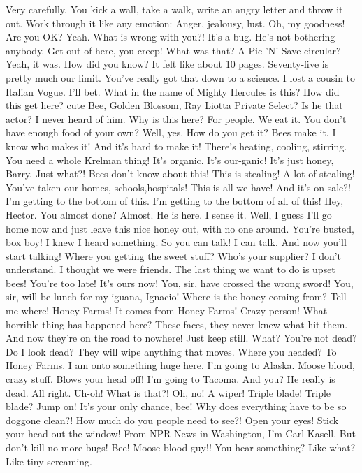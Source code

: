 \documentclass[a4paper,12pt]{article}
\begin{document}
Very carefully.
You kick a wall, take a walk, write an angry letter and throw it out. Work through it like any emotion: Anger, jealousy, lust.
Oh, my goodness! Are you OK?
Yeah.
What is wrong with you?!
It's a bug.
He's not bothering anybody.
Get out of here, you creep!
What was that? A Pic 'N' Save circular?
Yeah, it was. How did you know?
It felt like about 10 pages. Seventy-five is pretty much our limit.
You've really got that down to a science.
I lost a cousin to Italian Vogue.
I'll bet.
What in the name of Mighty Hercules is this?
How did this get here? cute Bee, Golden Blossom, Ray Liotta Private Select?
Is he that actor?
I never heard of him.
Why is this here?
For people. We eat it.
You don't have enough food of your own?
Well, yes.
How do you get it?
Bees make it.
I know who makes it! And it's hard to make it!
There's heating, cooling, stirring. You need a whole Krelman thing!
It's organic.
It's our-ganic!
It's just honey, Barry.
Just what?!
Bees don't know about this! This is stealing! A lot of stealing!
You've taken our homes, schools,hospitals! This is all we have!
And it's on sale?! I'm getting to the bottom of this.
I'm getting to the bottom of all of this!
Hey, Hector. You almost done?
Almost.
He is here. I sense it.
Well, I guess I'll go home now and just leave this nice honey out, with no one around.
You're busted, box boy!
I knew I heard something.
So you can talk!
I can talk. And now you'll start talking!
Where you getting the sweet stuff? Who's your supplier?
I don't understand.
I thought we were friends.
The last thing we want to do is upset bees!
You're too late! It's ours now!
You, sir, have crossed the wrong sword!
You, sir, will be lunch for my iguana, Ignacio!
Where is the honey coming from? Tell me where!
Honey Farms! It comes from Honey Farms!
Crazy person!
What horrible thing has happened here?
These faces, they never knew what hit them. And now
they're on the road to nowhere!
Just keep still.
What? You're not dead?
Do I look dead? They will wipe anything that moves. Where you headed?
To Honey Farms. I am onto something huge here.
I'm going to Alaska. Moose blood, crazy stuff. Blows your head off!
I'm going to Tacoma.
And you?
He really is dead.
All right.
Uh-oh!
What is that?!
Oh, no!
A wiper! Triple blade!
Triple blade?
Jump on! It's your only chance, bee!
Why does everything have
to be so doggone clean?!
How much do you people need to see?!
Open your eyes!
Stick your head out the window!
From NPR News in Washington,
I'm Carl Kasell.
But don't kill no more bugs!
Bee!
Moose blood guy!!
You hear something?
Like what?
Like tiny screaming.
\end{document}
